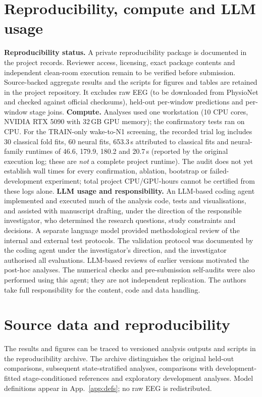 \documentclass{article}
\begin{document}
\section{Reproducibility, compute and LLM usage}
\label{app:repro}
\textbf{Reproducibility status.} A private reproducibility package is documented in the project records. Reviewer access, licensing, exact package contents and independent clean-room execution remain to be verified before submission. Source-backed aggregate results and the scripts for figures and tables are retained in the project repository. It excludes raw EEG (to be downloaded from PhysioNet and checked against official checksums), held-out per-window predictions and per-window stage joins. \textbf{Compute.} Analyses used one workstation (10 CPU cores, NVIDIA RTX 5090 with 32\,GB GPU memory); the confirmatory tests ran on CPU. For the TRAIN-only wake-to-N1 screening, the recorded trial log includes 30 classical fold fits, 60 neural fits, 653.3\,s attributed to classical fits and neural-family runtimes of 46.6, 179.9, 180.2 and 20.7\,s (reported by the original execution log; these are \emph{not} a complete project runtime). The audit does not yet establish wall times for every confirmation, ablation, bootstrap or failed-development experiment; total project CPU/GPU-hours cannot be certified from these logs alone. \textbf{LLM usage and responsibility.} An LLM-based coding agent implemented and executed much of the analysis code, tests and visualisations, and assisted with manuscript drafting, under the direction of the responsible investigator, who determined the research questions, study constraints and decisions. A separate language model provided methodological review of the internal and external test protocols. The validation protocol was documented by the coding agent under the investigator's direction, and the investigator authorised all evaluations. LLM-based reviews of earlier versions motivated the post-hoc analyses. The numerical checks and pre-submission self-audits were also performed using this agent; they are not independent replication. The authors take full responsibility for the content, code and data handling.

\section{Source data and reproducibility}
\label{app:trace}
The results and figures can be traced to versioned analysis outputs and scripts in the reproducibility archive. The archive distinguishes the original held-out comparisons, subsequent state-stratified analyses, comparisons with development-fitted stage-conditioned references and exploratory development analyses. Model definitions appear in App.~\ref{app:defs}; no raw EEG is redistributed.
\end{document}
